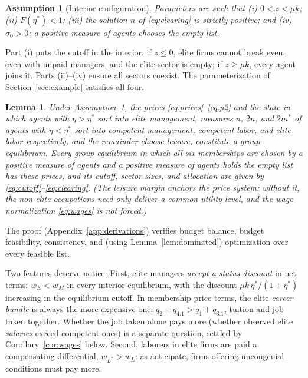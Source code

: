 \documentclass[12pt,letterpaper]{article}
\newtheorem{lemma}{Lemma}
\newtheorem{assumption}{Assumption}
\theoremstyle{definition}
\begin{document}
\begin{assumption}[Interior configuration]\label{ass:interior} Parameters are such that (i) $0 < z < \mu k$; (ii) $F(\eta^\ast)<1$; (iii) the solution $n$ of \eqref{eq:clearing} is strictly positive; and (iv) $\sigma_0> 0$: a positive measure of agents chooses the empty list.
\end{assumption}

Part (i) puts the cutoff in the interior: if $z\leq 0$, elite firms cannot break even, even with unpaid managers, and the elite sector is empty; if $z\geq\mu k$, every agent joins it.
Parts (ii)--(iv) ensure all sectors coexist.
The parameterization of Section~\ref{sec:example} satisfies all four.

\begin{lemma}\label{lem:characterization} Under Assumption~\ref{ass:interior}, the prices \eqref{eq:prices}--\eqref{eq:p2} and the state in which agents with $\eta>\eta^\ast$ sort into elite management, measures $n$, $2n$, and $2m^\ast$ of agents with $\eta<\eta^\ast$ sort into competent management, competent labor, and elite labor respectively, and the remainder choose leisure, constitute a group equilibrium.
Every group equilibrium in which all six memberships are chosen by a positive measure of agents \emph{and} a positive measure of agents holds the empty list has these prices, and its cutoff, sector sizes, and allocation are given by \eqref{eq:cutoff}--\eqref{eq:clearing}.
(The leisure margin anchors the price system: without it, the non-elite occupations need only deliver a common utility level, and the wage normalization \eqref{eq:wages} is not forced.)
\end{lemma}

The proof (Appendix~\ref{app:derivations}) verifies budget balance, budget feasibility, consistency, and (using Lemma~\ref{lem:dominated}) optimization over every feasible list.

Two features deserve notice.
First, elite managers \emph{accept a status discount} in net terms: $w_E<w_M$ in every interior equilibrium, with the discount $\mu k\,\eta^\ast/(1+\eta^\ast)$ increasing in the equilibrium cutoff.
In membership-price terms, the elite \emph{career bundle} is always the more expensive one: $q_2+q_{4.1} > q_1+q_{3.1}$, tuition and job taken together.
Whether the job taken alone pays more (whether observed elite \emph{salaries} exceed competent ones) is a separate question, settled by Corollary~\ref{cor:wages} below.
Second, laborers in elite firms are paid a compensating differential, $w_{L^\ast}>w_L$: as \citet[p.~151]{ellickson2006organization} anticipate, firms offering uncongenial conditions must pay more.
\end{document}
